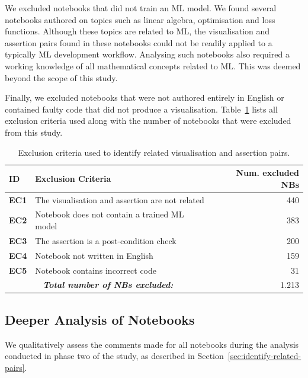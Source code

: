 \documentclass[conference]{IEEEtran}
\begin{document}
We excluded notebooks that did not train an ML model. We found several notebooks authored on topics such as linear algebra, optimisation and loss functions. Although these topics are related to ML, the visualisation and assertion pairs found in these notebooks could not be readily applied to a typically ML development workflow. Analysing such notebooks also required a working knowledge of all mathematical concepts related to ML. This was deemed beyond the scope of this study.

Finally, we excluded notebooks that were not authored entirely in English or contained faulty code that did not produce a visualisation. Table~\ref{tab:exclusion-criteria} lists all exclusion criteria used along with the number of notebooks that were excluded from this study.

\begin{table}
  \centering
  \caption{Exclusion criteria used to identify related visualisation and assertion pairs.}
  \begin{tabular}{l p{} r}
    \hline
    \textbf{ID} &
    \textbf{Exclusion Criteria} &
    \textbf{Num. excluded NBs}\\
    \hline
    \textbf{EC1} &
    The visualisation and assertion are not related &
    440\\
    \textbf{EC2} &
    Notebook does not contain a trained ML model &
    383\\
    \textbf{EC3} &
    The assertion is a post-condition check &
    200\\
    \textbf{EC4} &
    Notebook not written in English &
    159\\
    \textbf{EC5} &
    Notebook contains incorrect code &
    31\\
    \hline
    \multicolumn{2}{c}{\emph{\textbf{Total number of NBs excluded:}}} &
    1.213\\
    \hline
  \end{tabular}
  \label{tab:exclusion-criteria}
\end{table}

\subsection{Deeper Analysis of Notebooks}\label{sec:deep-dive}

We qualitatively assess the comments made for all notebooks during the analysis conducted in phase two of the study, as described in Section~\ref{sec:identify-related-pairs}. 
\end{document}
